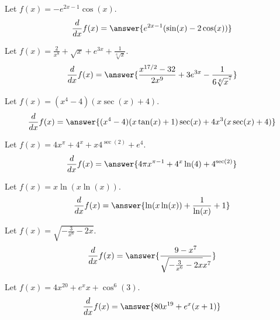 \documentclass{ximera}
\begin{document}
\begin{shuffle}
\begin{exercise}
Let $f(x)=-e^{2 x-1} \cos (x)$.
\[
\ddx f(x) = \answer{e^{2 x-1} (\sin (x)-2 \cos (x))}
\]
\end{exercise}

\begin{exercise}
Let $f(x)=\frac{2}{x^8}+\sqrt{x}+e^{3 x}+\frac{1}{\sqrt[6]{x}}$.
\[
\ddx f(x) = \answer{\frac{x^{17/2}-32}{2 x^9}+3 e^{3 x}-\frac{1}{6 \sqrt[6]{x}^7}}
\]
\end{exercise}

\begin{exercise}
Let $f(x)=(x^4-4) (x \sec (x)+4)$.
\[
\ddx f(x) = \answer{(x^4-4) (x \tan (x)+1) \sec (x)+4 x^3 (x \sec (x)+4)}
\]
\end{exercise}

\begin{exercise}
Let $f(x)=4 x^{\pi }+4^x+x 4^{\sec (2)}+e^4$.
\[
\ddx f(x) = \answer{4 \pi  x^{\pi -1}+4^x \ln (4)+4^{\sec (2)}}
\]
\end{exercise}



\begin{exercise}
Let $f(x)=x \ln (x \ln (x))$.
\[
\ddx f(x) = \answer{\ln (x \ln (x))+\frac{1}{\ln (x)}+1}
\]
\end{exercise}

\begin{exercise}
Let $f(x)=\sqrt{-\frac{3}{x^6}-2 x}$.
\[
\ddx f(x) = \answer{\frac{9-x^7}{\sqrt{-\frac{3}{x^6}-2 x} x^7}}
\]
\end{exercise}

\begin{exercise}
Let $f(x)=4 x^{20}+e^x x+\cos ^6(3)$.
\[
\ddx f(x) = \answer{80 x^{19}+e^x (x+1)}
\]
\end{exercise}


\end{shuffle}
\end{document}
